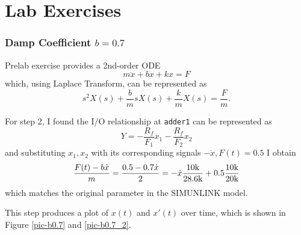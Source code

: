
\pagebreak\section{Lab Exercises}

\subsubsection*{Damp Coefficient $b=0.7$}

Prelab exercise provides a 2nd-order ODE
\[ m\ddot{x} + b\dot{x} + kx = F \]
which, using Laplace Transform, can be represented as 
\[ s^2 X(s) + \frac{b}{m}sX(s) + \frac{k}{m}X(s) = \frac{F}{m}. \]

For step 2, I found the I/O relationship at \texttt{adder1} can be represented
as 
\[ Y = -\frac{R_f}{F_1}x_1 - \frac{R_f}{F_2}x_2\]
and substituting $x_1, x_2$ with its corresponding signals $-\dot{x}, F(t)=0.5$
I obtain
\[ \frac{F(t)-b\dot{x}}{m}=\frac{0.5-0.7\dot{x}}{2}=-\dot{x}\frac{10\text{k}}{28.6\text{k}}
+0.5\frac{10\text{k}}{20\text{k}} \]
which matches the original parameter in the SIMUNLINK model.

This step produces a plot of $x(t)$ and $x'(t)$ over time, which is shown in
Figure \ref{pic-b0.7} and \ref{pic-b0.7_2}.

